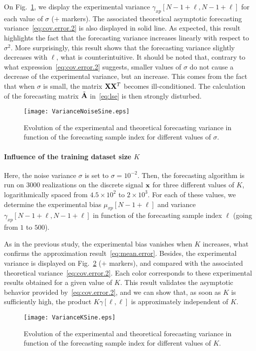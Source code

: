On Fig.~\ref{fig:res.noise.sine}, we display the experimental variance $\gamma_{xp}[N-1+\ell,N-1+\ell]$ for each value of $\sigma$ ($+$ markers). The associated theoretical asymptotic forecasting variance~\eqref{eq:cov.error.2} is also displayed in solid line. As expected, this result highlights the fact that the forecasting variance increases linearly with respect to $\sigma^2$. More surprisingly, this result shows that the forecasting variance slightly decreases with $\ell$, what is counterintuitive. It should be noted that, contrary to what expression~\eqref{eq:cov.error.2} suggests, smaller values of $\sigma$ do not  cause a decrease of the experimental variance, but an increase. This comes from the fact that when $\sigma$ is small, the matrix ${\mathbf X}{\mathbf X}^T$ becomes ill-conditioned. The calculation of the forecasting matrix $\tilde{{\mathbf A}}$ in~\eqref{eq:lse} is then strongly disturbed.
\begin{figure}
\texttt{[image: VarianceNoiseSine.eps]}
\caption{Evolution of the experimental and theoretical forecasting variance in function of the forecasting sample index for different values of $\sigma$.}
\label{fig:res.noise.sine}
\end{figure}

\paragraph{Influence of the training dataset size $K$} Here, the noise variance $\sigma$ is set to $\sigma=10^{-2}$. Then, the forecasting algorithm is run on 3000 realizations on the discrete signal ${\mathbf x}$ for three different values of $K$, logarithmically spaced from $4.5\times 10^{2}$ to $2\times 10^{3}$. For each of these values, we determine the experimental bias $\mu_{xp}[N-1+\ell]$ and variance $\gamma_{xp}[N-1+\ell,N-1+\ell]$ in function of the forecasting sample index $\ell$ (going from $1$ to $500$). 

As in the previous study, the experimental bias vanishes when $K$ increases, what confirms the approximation result~\eqref{eq:mean.error}. Besides, the experimental variance  is displayed on Fig.~\ref{fig:res.size.sine} ($+$ markers), and compared with the associated theoretical variance~\eqref{eq:cov.error.2}. Each color corresponds to these experimental results obtained for a given value of $K$. This result validates the asymptotic behavior provided by~\eqref{eq:cov.error.2}, and we can show that, as soon as $K$ is sufficiently high, the product $K\gamma[\ell,\ell]$ is approximately independent of $K$.
\begin{figure}
\texttt{[image: VarianceKSine.eps]}
\caption{Evolution of the experimental and theoretical forecasting variance in function of the forecasting sample index for different values of $K$.}
\label{fig:res.size.sine}
\end{figure}

